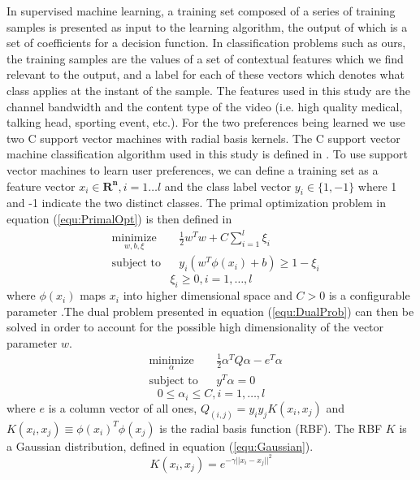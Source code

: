 \documentclass[preprint, 12pt]{elsarticle}
\begin{document}
In supervised machine learning, a training set composed of a series of training samples is presented as input to the learning algorithm, the output of which is a set of coefficients for a decision function. In classification problems such as ours, the training samples are the values of a set of contextual features which we find relevant to the output, and a label for each of these vectors which denotes what class applies at the instant of the sample. The features used in this study are the channel bandwidth and the content type of the video (i.e. high quality medical, talking head, sporting event, etc.). For the two preferences being learned we use two C support vector machines with radial basis kernels. The C support vector machine classification algorithm used in this study is defined in \cite{LibSVM}. To use support vector machines to learn user preferences, we can define a training set as a feature vector $x_i \in \mathbf{R^n}  ,i=1\ldots{l}$ and the class label vector $y_i \in \lbrace 1,-1 \rbrace $ where 1 and -1 indicate the two distinct classes. The primal optimization problem in equation (\ref{equ:PrimalOpt}) is then defined in \cite{LibSVM}
\begin{equation}
\begin{aligned}
\label{equ:PrimalOpt}
& \underset{w,b,\xi}{\text{minimize}}
& & \frac{1}{2}w^Tw+C\sum_{i=1}^{l} \xi_i \\
& \text{subject to}
& &  y_i(w^T\phi(x_i) + b) \ge 1 - \xi_i
\end{aligned}
\end{equation}
\[ \xi_i \ge 0, i = 1,\ldots ,l \]
where $\phi (x_i)$ maps $x_i$ into higher dimensional space and $C > 0$ is a configurable parameter \cite{LibSVM}.The dual problem presented in equation (\ref{equ:DualProb}) can then be solved in order to account for the possible high dimensionality of the vector parameter $w$.
\begin{equation}
\begin{aligned}
\label{equ:DualProb}
& \underset{\alpha}{\text{minimize}}
& & \frac{1}{2}\alpha^TQ\alpha-e^T\alpha \\
& \text{subject to}
& &  y^T\alpha = 0
\end{aligned}
\end{equation}
\[ 0 \le \alpha_i \le C, i = 1,\ldots ,l \]
where $e$ is a column vector of all ones, $Q_(i,j)=y_i y_j K(x_i,x_j)$ and $K(x_i,x_j ) \equiv \phi (x_i )^T \phi (x_j)$ is the radial basis function (RBF). The RBF $K$ is a Gaussian distribution, defined in equation (\ref{equ:Gaussian}).
\begin{equation}
\label{equ:Gaussian}
K(x_i, x_j) = e^{-\gamma ||x_i - x_j||^{2}}
\end{equation}
\end{document}

